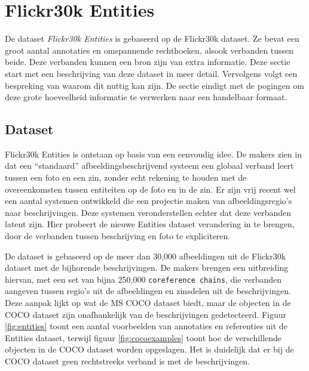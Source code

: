 \section{Flickr30k Entities}
De dataset \emph{Flickr30k Entities}\cite{Plummer2015} is gebaseerd op de Flickr30k dataset. Ze bevat een groot aantal annotaties en omspannende rechthoeken, alsook verbanden tussen beide. Deze verbanden kunnen een bron zijn van extra informatie. Deze sectie start met een beschrijving van deze dataset in meer detail. Vervolgens volgt een bespreking van waarom dit nuttig kan zijn. De sectie eindigt met de pogingen om deze grote hoeveelheid informatie te verwerken naar een handelbaar formaat. 

\subsection{Dataset}
\label{sub:Dataset}
Flickr30k Entities is ontstaan op basis van een eenvoudig idee. De makers zien in dat een ``standaard'' afbeeldingsbeschrijvend systeem een globaal verband leert tussen een foto en een zin, zonder echt rekening te houden met de overeenkomsten tussen entiteiten op de foto en in de zin. Er zijn vrij recent wel een aantal systemen ontwikkeld die een projectie maken van afbeeldingsregio's naar beschrijvingen. Deze systemen veronderstellen echter dat deze verbanden latent zijn. Hier probeert de nieuwe Entities dataset verandering in te brengen, door de verbanden tussen beschrijving en foto te expliciteren.

De dataset is gebaseerd op de meer dan 30,000 afbeeldingen uit de Flickr30k dataset\cite{Young2014} met de bijhorende beschrijvingen. De makers brengen een uitbreiding hiervan, met een set van bijna 250,000 \texttt{coreference chains}, die verbanden aangeven tussen regio's uit de afbeeldingen en zinsdelen uit de beschrijvingen. Deze aanpak lijkt op wat de MS COCO\cite{Lin2014} dataset biedt, maar de objecten in de COCO dataset zijn onafhankelijk van de beschrijvingen gedetecteerd. Figuur \ref{fig:entities} toont een aantal voorbeelden van annotaties en referenties uit de Entities dataset, terwijl figuur \ref{fig:cocoexamples} toont hoe de verschillende objecten in de COCO dataset worden opgeslagen. Het is duidelijk dat er bij de COCO dataset geen rechtstreeks verband is met de beschrijvingen. 

